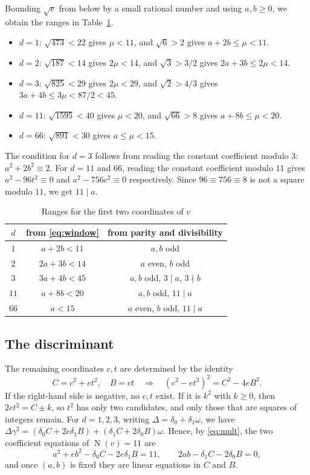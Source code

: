 \documentclass[a4paper,11pt]{article}
\theoremstyle{plain}
\theoremstyle{definition}
\theoremstyle{remark}
\numberwithin{equation}{section}
\numberwithin{table}{section}
\newcommand{\Nm}{\operatorname{N}}
\begin{document}
Bounding $\sqrt e$ from below by a small rational number and using $a,b\ge0$, we obtain the ranges in Table~\ref{tab:ranges}.
\begin{itemize}
\item $d=1$: $\sqrt{473}<22$ gives $\mu<11$, and $\sqrt6>2$ gives $a+2b\le\mu<11$.
\item $d=2$: $\sqrt{187}<14$ gives $2\mu<14$, and $\sqrt3>3/2$ gives $2a+3b\le2\mu<14$.
\item $d=3$: $\sqrt{825}<29$ gives $2\mu<29$, and $\sqrt2>4/3$ gives $3a+4b\le3\mu<87/2<45$.
\item $d=11$: $\sqrt{1595}<40$ gives $\mu<20$, and $\sqrt{66}>8$ gives $a+8b\le\mu<20$.
\item $d=66$: $\sqrt{891}<30$ gives $a\le\mu<15$.
\end{itemize}
The condition for $d=3$ follows from reading the constant coefficient modulo $3$: $a^2+2b^2\equiv2$.
For $d=11$ and $66$, reading the constant coefficient modulo $11$ gives $a^2-96t^2\equiv0$ and $a^2-756c^2\equiv0$ respectively.
Since $96\equiv756\equiv8$ is not a square modulo $11$, we get $11\mid a$.

\begin{table}[htbp]
\centering
\caption{Ranges for the first two coordinates of $v$}\label{tab:ranges}
\begin{tabular}{ccc}
\toprule
$d$ & from \eqref{eq:window} & from parity and divisibility\\
\midrule
$1$ & $a+2b<11$ & $a,b$ odd\\
$2$ & $2a+3b<14$ & $a$ even, $b$ odd\\
$3$ & $3a+4b<45$ & $a,b$ odd, $3\mid a$, $3\nmid b$\\
$11$ & $a+8b<20$ & $a,b$ odd, $11\mid a$\\
$66$ & $a<15$ & $a$ even, $b$ odd, $11\mid a$\\
\bottomrule
\end{tabular}
\end{table}

\subsection{The discriminant}

The remaining coordinates $c,t$ are determined by the identity
\begin{equation}\label{eq:disc}
C=c^2+et^2,\quad B=ct\quad\Longrightarrow\quad(c^2-et^2)^2=C^2-4eB^2.
\end{equation}
If the right-hand side is negative, no $c,t$ exist. If it is $k^2$ with $k\ge0$, then $2et^2=C\pm k$, so $t^2$ has only two candidates, and only those that are squares of integers remain.
For $d=1,2,3$, writing $\Delta=\delta_0+\delta_1\omega$, we have $\Delta\gamma^2=(\delta_0C+2e\delta_1B)+(\delta_1C+2\delta_0B)\omega$.
Hence, by \eqref{eq:mult}, the two coefficient equations of $\Nm(v)=11$ are
\[
a^2+eb^2-\delta_0C-2e\delta_1B=11,\qquad2ab-\delta_1C-2\delta_0B=0,
\]
and once $(a,b)$ is fixed they are linear equations in $C$ and $B$.
\end{document}
